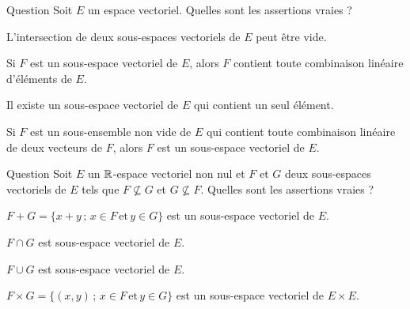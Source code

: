 \begin{multi}[multiple,feedback=
{L'intersection de deux sous-espaces vectoriels de \(E\) contient au moins le vecteur nul. 
Le seul sous-espace vectoriel de \(E\) qui contient un seul élément est \(\{0_E\}\), où \(0_E\) est le zéro de \(E\).\\
Un sous-ensemble non vide de \(E\) est un sous-espace vectoriel de \(E\) si et seulement
s'il contient toute combinaison linéaire d'éléments de \(F\). Ceci revient à dire que \(F\) contient 
toute combinaison linéaire de deux éléments de \(F\).
}]{Question}
Soit \(E\) un espace vectoriel. Quelles sont les assertions vraies ?

    \item L'intersection de deux sous-espaces vectoriels de \(E\) peut être vide.
    \item Si \(F\) est un sous-espace vectoriel de \(E\), alors \(F\) contient toute combinaison linéaire d'éléments de \(E\).
    \item* Il existe un sous-espace vectoriel de \(E\) qui contient un seul élément.
    \item* Si \(F\) est un sous-ensemble non vide de \(E\) qui contient  toute combinaison linéaire de deux vecteurs de \(F\), alors \(F\) est un sous-espace vectoriel de \(E\).
\end{multi}


\begin{multi}[multiple,feedback=
{La somme, l'intersection et le produit cartésien de sous-espaces vectoriels est un espace vectoriel. Par contre, la réunion de deux sous-espaces vectoriels n'est un espace vectoriel que si l'un des deux est inclus dans l'autre.
}]{Question}
Soit \(E\) un \(\mathbb{R}\)-espace vectoriel non nul et \(F\) et \(G\) deux sous-espaces vectoriels de \(E\) tels que \(F\nsubseteq G\) et  \(G\nsubseteq F\). Quelles sont les assertions vraies ?

    \item* \(F+G =\{x+y\, ; \, x\in F \,\mbox {et}\,  y \in G \}\) est un sous-espace vectoriel de \(E\).
    \item* \(F\cap G \) est sous-espace vectoriel de \(E\).
    \item \(F\cup G \) est sous-espace vectoriel de \(E\).
    \item* \(F\times G = \{(x,y) \, ; \, x \in F\,\mbox {et}\, y \in G \}\) est un sous-espace vectoriel de \(E\times E\).
\end{multi}


